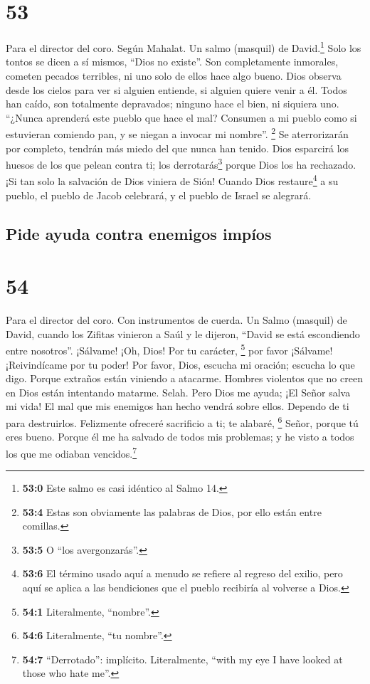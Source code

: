 \hypertarget{section-52}{%
\section{53}\label{section-52}}

Para el director del coro. Según Mahalat. Un salmo (masquil) de
David.\footnote{\textbf{53:0} Este salmo es casi idéntico al Salmo 14.}
 Solo los tontos se dicen a sí mismos, ``Dios no existe''.
Son completamente inmorales, cometen pecados terribles, ni uno solo de
ellos hace algo bueno.  Dios observa desde los cielos para
ver si alguien entiende, si alguien quiere venir a él. 
Todos han caído, son totalmente depravados; ninguno hace el bien, ni
siquiera uno.  ``¿Nunca aprenderá este pueblo que hace el
mal? Consumen a mi pueblo como si estuvieran comiendo pan, y se niegan a
invocar mi nombre''. \footnote{\textbf{53:4} Estas son obviamente las
  palabras de Dios, por ello están entre comillas.}  Se
aterrorizarán por completo, tendrán más miedo del que nunca han tenido.
Dios esparcirá los huesos de los que pelean contra ti; los
derrotarás\footnote{\textbf{53:5} O ``los avergonzarás''.} porque Dios
los ha rechazado.  ¡Si tan solo la salvación de Dios
viniera de Sión! Cuando Dios restaure\footnote{\textbf{53:6} El término
  usado aquí a menudo se refiere al regreso del exilio, pero aquí se
  aplica a las bendiciones que el pueblo recibiría al volverse a Dios.}
a su pueblo, el pueblo de Jacob celebrará, y el pueblo de Israel se
alegrará.

\hypertarget{pide-ayuda-contra-enemigos-impuxedos}{%
\subsection{Pide ayuda contra enemigos
impíos}\label{pide-ayuda-contra-enemigos-impuxedos}}

\hypertarget{section-53}{%
\section{54}\label{section-53}}

Para el director del coro. Con instrumentos de cuerda. Un Salmo
(masquil) de David, cuando los Zifitas vinieron a Saúl y le dijeron,
``David se está escondiendo entre nosotros''.  ¡Sálvame!
¡Oh, Dios! Por tu carácter, \footnote{\textbf{54:1} Literalmente,
  ``nombre''.} por favor ¡Sálvame! ¡Reivindícame por tu poder!
 Por favor, Dios, escucha mi oración; escucha lo que digo.
 Porque extraños están viniendo a atacarme. Hombres
violentos que no creen en Dios están intentando matarme. Selah.
 Pero Dios me ayuda; ¡El Señor salva mi vida!
 El mal que mis enemigos han hecho vendrá sobre ellos.
Dependo de ti para destruirlos.  Felizmente ofreceré
sacrificio a ti; te alabaré, \footnote{\textbf{54:6} Literalmente, ``tu
  nombre''.} Señor, porque tú eres bueno.  Porque él me ha
salvado de todos mis problemas; y he visto a todos los que me odiaban
vencidos.\footnote{\textbf{54:7} ``Derrotado'': implícito. Literalmente,
  ``with my eye I have looked at those who hate me''.}

